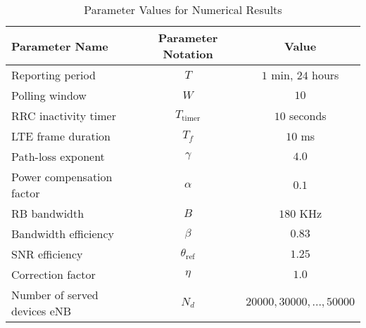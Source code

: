 \begin{table}[]
	\centering
	\caption{Parameter Values for Numerical Results}
	\label{tab:numerical-result-parameters}
	\begin{tabular}{@{}lcc@{}}
		\toprule
		Parameter Name               & Parameter Notation    & Value                           \\ \midrule
		Reporting period             & $T$                   & $1$ min, $24$ hours \\
		Polling window               & $W$                   & $10$                            \\
		RRC inactivity timer         & $T_{\text{timer}}$    & $10$ seconds                    \\
		LTE frame duration           & $T_f$                 & $10$ ms                         \\
		Path-loss exponent           & $\gamma$              & $4.0$                           \\
		Power compensation factor    & $\alpha $             & $0.1$                           \\
		RB bandwidth                 & $B$                   & $180$ KHz                       \\
		Bandwidth efficiency         & $\beta$               & $0.83$                          \\
		SNR efficiency               & $\theta_{\text{ref}}$ & $1.25$                          \\
		Correction factor            & $\eta$                & $1.0$                           \\
		Number of served devices eNB & $N_d$                 & $20000,30000,..., 50000$        \\ \bottomrule
\end{tabular}
\end{table}
